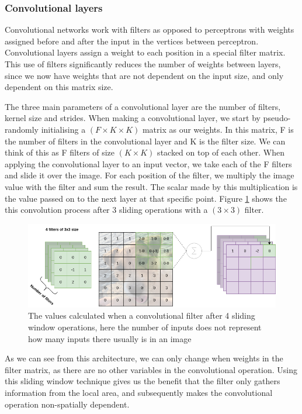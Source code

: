 \subsubsection{Convolutional layers}

Convolutional networks work with filters as opposed to perceptrons with weights assigned before and after the input in the vertices between perceptron. Convolutional layers assign a weight to each position in a special filter matrix. This use of filters significantly reduces the number of weights between layers, since we now have weights that are not dependent on the input size, and only dependent on this matrix size.

The three main parameters of a convolutional layer are the number of filters, kernel size and strides.
When making a convolutional layer, we start by pseudo-randomly initialising a $ (F \times K \times K)$ matrix as our weights.
In this matrix, F is the number of filters in the convolutional layer and K is the filter size. We can think of this as F filters of size $(K \times K)$ stacked on top of each other. 
When applying the convolutional layer to an input vector, we take each of the F filters and slide it over the image. 
For each position of the filter, we multiply the image value with the filter and sum the result. The scalar made by this multiplication is the value passed on to the next layer at that specific point.
Figure \ref{fig:conv_opp} shows the this convolution process after 3 sliding operations with a $(3 \times 3)$ filter.
 
\begin{figure}[t]
        \centering
        \includegraphics[scale=0.5]{background/figures/Conv_filter.png}
        \caption{The values calculated when a convolutional filter after 4 sliding window operations, here the number of inputs does not represent how many inputs there usually is in an image}
        \label{fig:conv_opp}
\end{figure}


As we can see from this architecture, we can only change when weights in the filter matrix, as there are no other variables in the convolutional operation. Using this sliding window technique gives us the benefit that the filter only gathers information from the local area, and subsequently makes the convolutional operation non-spatially dependent.  

